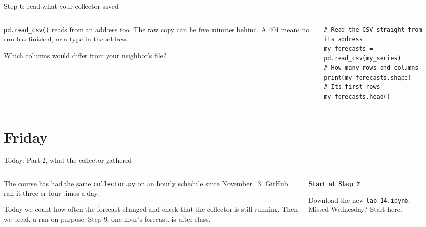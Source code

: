 \documentclass[9pt,aspectratio=169]{beamer}
\begin{document}
\begin{frame}[fragile]{Step 6: read what your collector saved}
    \begin{columns}[T]
        \begin{column}{0.37\textwidth}
            \texttt{pd.read\_csv()} reads from an address too. The raw copy can be five minutes behind. A 404 means no run has finished, or a typo in the address.

            \medskip
            Which columns would differ from your neighbor's file?
        \end{column}
        \begin{column}{0.6\textwidth}
\begin{lstlisting}
# Read the CSV straight from its address
my_forecasts = pd.read_csv(my_series)
# How many rows and columns
print(my_forecasts.shape)
# Its first rows
my_forecasts.head()
\end{lstlisting}
        \end{column}
    \end{columns}
\end{frame}

\section{Friday}

\begin{frame}{Today: Part 2, what the collector gathered}
    \begin{columns}[T]
        \begin{column}{0.6\textwidth}
            The course has had the same \texttt{collector.py} on an hourly schedule since November 13. GitHub ran it three or four times a day.

            \medskip
            Today we count how often the forecast changed and check that the collector is still running. Then we break a run on purpose. Step 9, one hour's forecast, is after class.
        \end{column}
        \begin{column}{0.35\textwidth}
            \textbf{Start at Step 7}\\[2pt]
            {\footnotesize Download the new \texttt{lab-14.ipynb}. Missed Wednesday? Start here.\par}
        \end{column}
    \end{columns}
\end{frame}
\end{document}
